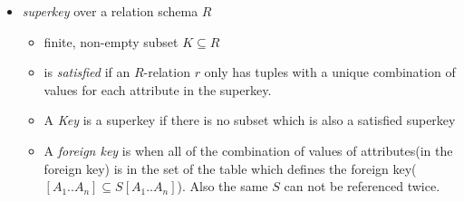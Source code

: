 \documentclass[10pt,a4paper]{article}
\begin{document}
\begin{itemize}
			\item \textit{superkey} over a relation schema $R$
			\begin{itemize}
				\item finite, non-empty subset $K \subseteq R$
				\item is \textit{satisfied} if an $R$-relation $r$ only has tuples with a unique combination of values for each attribute in the superkey.
				\item A \textit{Key} is a superkey if there is no subset which is also a satisfied superkey
				\item A \textit{foreign key} is when all of the combination of values of attributes(in the foreign key) is in the set of the table which defines the foreign key($[A_1..A_n] \subseteq S[A_1..A_n]$). Also the same $S$ can not be referenced twice.
			\end{itemize}
		\end{itemize}
	
\end{document}
